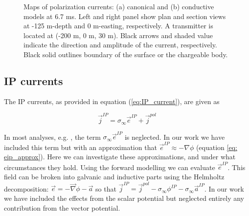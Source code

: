\documentclass[extra,mreferee]{gji}
\newcommand{\grad}{\vec \nabla}
\newcommand{\siginf}{\sigma_\infty}
\renewcommand {\j}  { {\vec j} }
\newcommand {\e}  { {\vec e} }
\begin{document}
\begin{figure}
  \caption{Maps of polarization currents: (a) canonical and (b) conductive models at 6.7 ms. Left and right panel show plan and section views at -125 m-depth and 0 m-easting, respectively. A transmitter is located at (-200 m, 0 m, 30 m). Black arrows and shaded value indicate the direction and amplitude of the current, respectively. Black solid outlines boundary of the surface or the chargeable body.}
  \label{F:Polarizationcurrent_late}
\end{figure}
\clearpage

\subsection{IP currents}
The IP currents, as provided in equation (\ref{eq:IP_current}), are given as 
\begin{linenomath*}
\begin{equation}
  \j^{IP}=\siginf  \e^{IP} + \j^{pol}
\end{equation}
\end{linenomath*}
In most analyses, e.g. \cite{Smith1988a}, the term $\siginf \e^{IP}$ is neglected. In our work we have included this term but with an approximation that $\e^{IP} \approx -\nabla \phi$  (equation \ref{eq: eip_approx}). Here we can investigate these approximations, and under what circumstances they hold. Using the forward modelling we can evaluate $\e^{IP}$.
This field can be broken into galvanic and inductive parts using the Helmholtz decomposition: $\e=-\grad \phi-\vec{a}$ so that $\j^{IP} = \j^{pol} -\siginf \phi^{IP} - \siginf \vec{a}^{IP}$.
In our work we have included the effects from the scalar potential but neglected entirely any contribution from the vector potential. 
\end{document}
